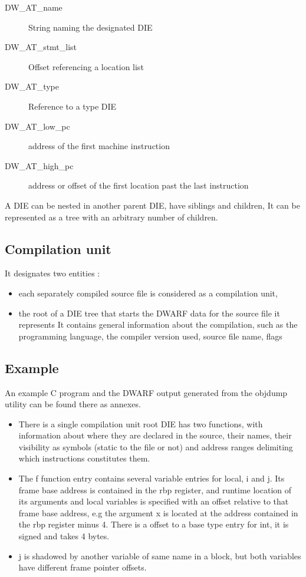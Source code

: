\begin{description}
    \item[DW\_AT\_name] String naming the designated DIE
    \item[DW\_AT\_stmt\_list] Offset referencing a location list
    \item[DW\_AT\_type] Reference to a type DIE
    \item[DW\_AT\_low\_pc] address of the first machine instruction
    \item[DW\_AT\_high\_pc] address or offset of the first location past the last instruction
\end{description}

A DIE can be nested in another parent DIE, have siblings and children,
It can be represented as a tree with an arbitrary number of children.

\subsection{Compilation unit}

It designates two entities :

\begin{itemize}
    \item each separately compiled source file is considered as a compilation
        unit,
    \item the root of a DIE tree that starts the DWARF data for the source file it represents
        It contains general information about the compilation,
        such as the programming language, the compiler version used, source file name, flags
\end{itemize}

\subsection{Example}

An example C program and the DWARF output generated from the objdump utility can be
found there as annexes.

\begin{itemize}
    \item  There is a single compilation unit root DIE has two functions, with information about where they are declared in the source, their names, their visibility as symbols (static to the file or not) and address ranges delimiting which instructions constitutes them.

    \item  The f function entry contains several variable entries for local, i and j.
Its frame base address is contained in the rbp register,
and runtime location of its arguments and local variables is specified with an
offset relative to that frame base address, e.g the argument x is located at the
address contained in the rbp register minus 4.
There is a offset to a base type entry for int, it is signed and takes 4 bytes.

    \item j is shadowed by another variable of same name in a block, but both variables
have different frame pointer offsets.

\end{itemize}


